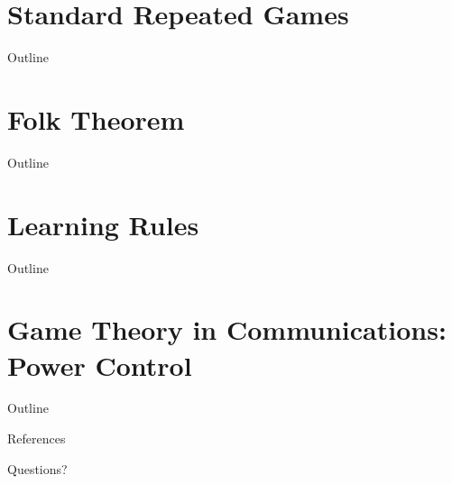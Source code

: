 \documentclass[10pt]{beamer}
\begin{document}


\section{Standard Repeated Games}
\begin{frame}{Outline}
    \tableofcontents[currentsection]
\end{frame}



\section{Folk Theorem}
\begin{frame}{Outline}
    \tableofcontents[currentsection]
\end{frame}



\section{Learning Rules}
\begin{frame}{Outline}
    \tableofcontents[currentsection]
\end{frame}



\section{Game Theory in Communications: Power Control}
\begin{frame}{Outline}
    \tableofcontents[currentsection]
\end{frame}



\begin{frame}{References}
    \nocite{*}
    
    
\end{frame}

\begin{frame}[standout]
    Questions?
\end{frame}
\end{document}
